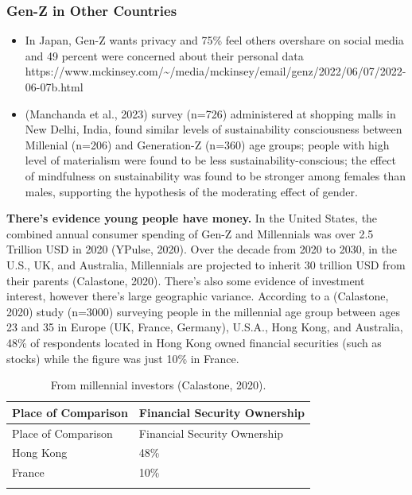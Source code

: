 \documentclass[
  letterpaper,
  DIV=11,
  numbers=noendperiod]{scrartcl}
\begin{document}
\subsubsection{Gen-Z in Other Countries}\label{gen-z-in-other-countries}

\begin{itemize}
\item
  In Japan, Gen-Z wants privacy and 75\% feel others overshare on social
  media and 49 percent were concerned about their personal data
  https://www.mckinsey.com/\textasciitilde/media/mckinsey/email/genz/2022/06/07/2022-06-07b.html
\item
  (Manchanda et al., 2023) survey (n=726) administered at shopping malls
  in New Delhi, India, found similar levels of sustainability
  consciousness between Millenial (n=206) and Generation-Z (n=360) age
  groups; people with high level of materialism were found to be less
  sustainability-conscious; the effect of mindfulness on sustainability
  was found to be stronger among females than males, supporting the
  hypothesis of the moderating effect of gender.
\end{itemize}

\textbf{There's evidence young people have money.} In the United States,
the combined annual consumer spending of Gen-Z and Millennials was over
2.5 Trillion USD in 2020 (YPulse, 2020). Over the decade from 2020 to
2030, in the U.S., UK, and Australia, Millennials are projected to
inherit 30 trillion USD from their parents (Calastone, 2020). There's
also some evidence of investment interest, however there's large
geographic variance. According to a (Calastone, 2020) study (n=3000)
surveying people in the millennial age group between ages 23 and 35 in
Europe (UK, France, Germany), U.S.A., Hong Kong, and Australia, 48\% of
respondents located in Hong Kong owned financial securities (such as
stocks) while the figure was just 10\% in France.

\begin{longtable}[]{@{}ll@{}}
\caption{From millennial investors (Calastone, 2020).}\tabularnewline
\toprule\noalign{}
Place of Comparison & Financial Security Ownership \\
\midrule\noalign{}
\endfirsthead
\toprule\noalign{}
Place of Comparison & Financial Security Ownership \\
\midrule\noalign{}
\endhead
\bottomrule\noalign{}
\endlastfoot
Hong Kong & 48\% \\
France & 10\% \\
& \\
\end{longtable}
\end{document}
